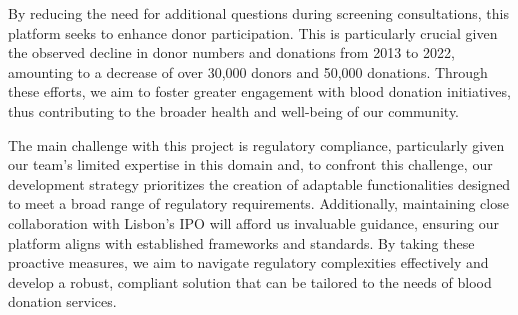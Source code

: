 By reducing the need for additional questions during screening consultations, this platform seeks to enhance donor participation. This is particularly crucial given the observed decline in donor numbers and donations from 2013 to 2022, amounting to a decrease of over 30,000 donors and 50,000 donations. Through these efforts, we aim to foster greater engagement with blood donation initiatives, thus contributing to the broader health and well-being of our community.

The main challenge with this project is regulatory compliance, particularly given our team's limited expertise in this domain and, to confront this challenge, our development strategy prioritizes the creation of adaptable functionalities designed to meet a broad range of regulatory requirements. Additionally, maintaining close collaboration with Lisbon's IPO will afford us invaluable guidance, ensuring our platform aligns with established frameworks and standards. By taking these proactive measures, we aim to navigate regulatory complexities effectively and develop a robust, compliant solution that can be tailored to the needs of blood donation services.
%
%
%
%
%
%
%
%
